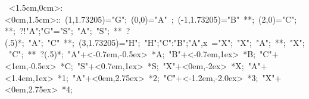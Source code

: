 
%

\hbox{
\xy    <1.5cm,0cm>:<0cm,1.5cm>::
       (1,1.73205)="G"; (0,0)="A" ;  
       (-1,1.73205)="B"  **\dir{-};  
       (2,0)="C"; **\dir{-}; ?!{"A";"G"}="S"; 
       "A"; "S"; **\dir{-} ?(.5)*\dir{>}; "A";
       "C" **\dir{-}; 
       (3,1.73205)="H"; {"H";"C":"B";"A",x} ="X";
       "X"; "A"; **\dir{--};
       "X"; "C"; **\dir{--} ?(.5)*\dir{>};
       "A"+<-0.7em,-0.5ex> *{A};
       "B"+<-0.7em,1ex> *{B};
       "C"+<1em,-0.5ex> *{C};
       "S"+<0.7em,1ex> *{S};
       "X"+<0em,-2ex> *{X};
       "A"+<1.4em,1ex> *{1};
       "A"+<0em,2.75ex> *{2};
       "C"+<-1.2em,-2.0ex> *{3};
       "X"+<0em,2.75ex> *{4};
       \endxy}

